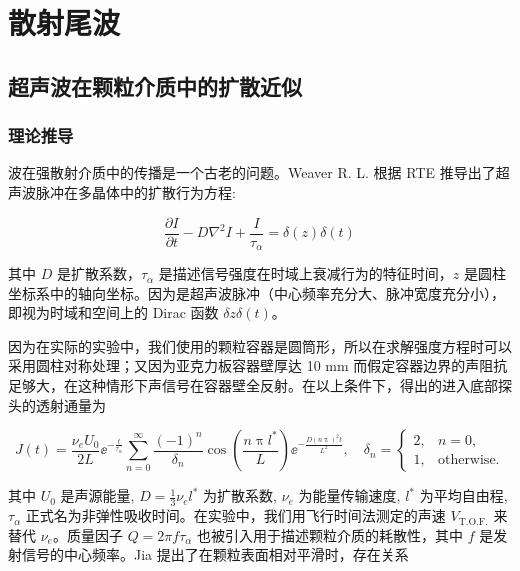 
\chapter{散射尾波}

\section{超声波在颗粒介质中的扩散近似}

\subsection{理论推导}

波在强散射介质中的传播是一个古老的问题。Weaver R. L. 根据 RTE 推导出了超声波脉冲在多晶体中的扩散行为方程\cite{diffusivity}:

\begin{equation}
  \frac{\partial I}{\partial t} - D\nabla^{2}I + \frac{I}{\tau_{\alpha}} = \delta(z)\delta(t)
\end{equation}

其中 $D$ 是扩散系数，$\tau_{\alpha}$ 是描述信号强度在时域上衰减行为的特征时间，$z$ 是圆柱坐标系中的轴向坐标。因为是超声波脉冲（中心频率充分大、脉冲宽度充分小），即视为时域和空间上的 Dirac 函数 $\delta{z}\delta(t)$。

因为在实际的实验中，我们使用的颗粒容器是圆筒形，所以在求解强度方程时可以采用圆柱对称处理；又因为亚克力板容器壁厚达 10 \unit{\milli\meter} 而假定容器边界的声阻抗足够大，在这种情形下声信号在容器壁全反射。在以上条件下，得出的进入底部探头的透射通量\cite{PhysRevLett.93.154303}为

\begin{equation}
  J(t) = \frac{\nu_{e} U_{0}}{2L}{\ee}^{-\frac{t}{\tau_{\alpha}}}\sum_{n=0}^{\infty}\frac{(-1)^{n}}{\delta_{n}}\cos{\left(\frac{n\uppi l^{*}}{L}\right)}{\ee}^{-\frac{D(n\uppi)^{2}t}{L^{2}}},\quad \delta_{n} = \begin{cases}
    2, & n = 0, \\
    1, & \text{otherwise}.
  \end{cases}
\end{equation}

其中 $U_{0}$ 是声源能量, $D = \frac{1}{3}\nu_{e}l^{*}$ 为扩散系数, $\nu_{e}$ 为能量传输速度, $l^{*}$ 为平均自由程, $\tau_{\alpha}$ 正式名为非弹性吸收时间。在实验中，我们用飞行时间法测定的声速 $V_{\text{T.O.F.}}$ 来替代 $\nu_{e}$。质量因子 $Q = 2\pi f\tau_{\alpha}$ 也被引入用于描述颗粒介质的耗散性，其中 $f$ 是发射信号的中心频率。Jia 提出了在颗粒表面相对平滑时，存在关系\cite{PhysRevLett.101.138001}

